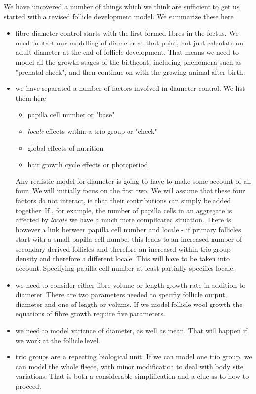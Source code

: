 \documentclass[titlepage]{article}  %
\begin{document}
We have uncovered a number of things which we think are sufficient to get us started with a revised follicle development model. We summarize these here
\begin{itemize}
\item fibre diameter control starts with the first formed fibres in the foetus. We need to start our modelling of diameter at that point, not just calculate an adult diameter at the end of follicle development. That means we need to model all the growth stages of the birthcoat, including phenomena such as "prenatal check", and then continue on with the growing animal after birth.
\item we have separated a number of factors involved in diameter control. We list them here
  \begin{itemize}
    \item papilla cell number or "base"
    \item {\em locale} effects within a trio group or "check"
    \item global effects of nutrition
    \item hair growth cycle effects or photoperiod
  \end{itemize}
Any realistic model for diameter is going to have to make some account of all four. We will initially focus on the first two. We will assume that these four factors do not interact, ie that their contributions can simply be added together. If , for example, the number of papilla cells in an aggregate is affected by {\em locale} we have a much more complicated situation. There is however a link between papilla cell number and locale - if primary follicles start with a small papilla cell number this leads to an increased number of secondary derived follicles and therefore an increased within trio group density and therefore a different locale. This will have to be taken into account.  Specifying papilla cell number at least partially specifies locale.
\item we need to consider either fibre volume or length growth rate in addition to diameter. There are two parameters needed to specifiy follicle output, diameter and one of length or volume.  If we model follicle wool growth the equations of fibre growth require five parameters.
\item we need to model variance of diameter, as well as mean. That will happen if we work at the follicle level.
\item trio groups are a repeating biological unit. If we can model one trio group, we can model the whole fleece, with minor modification to deal with body site variations. That is both a considerable simplification and a clue as to how to proceed.
\end{itemize}
\end{document}
